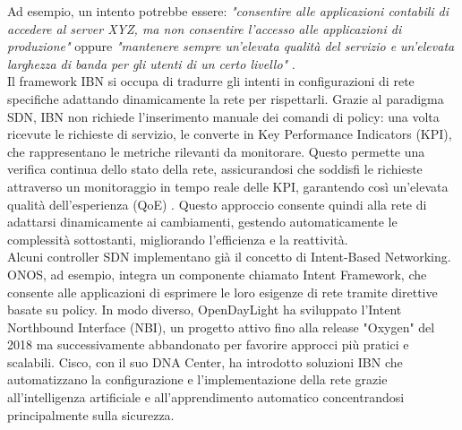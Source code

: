 Ad esempio, un intento potrebbe essere: \textit{"consentire alle applicazioni contabili di accedere al server XYZ, ma non consentire l’accesso alle applicazioni di produzione"} oppure
\textit{"mantenere sempre un'elevata qualità del servizio e un'elevata larghezza di banda per gli utenti di un certo livello"} \cite{esempint}.
\\Il framework IBN si occupa di tradurre gli intenti
in configurazioni di rete specifiche adattando dinamicamente la rete per rispettarli. %
Grazie al paradigma SDN, IBN non richiede l'inserimento manuale dei comandi di policy: una volta ricevute le richieste di servizio, le converte in Key Performance Indicators (KPI), che rappresentano le metriche rilevanti da monitorare. 
Questo permette una verifica continua dello stato della rete, assicurandosi che soddisfi le richieste attraverso un monitoraggio in tempo reale delle KPI, garantendo così un'elevata qualità dell'esperienza (QoE) \cite{qoe}.
Questo approccio consente quindi alla rete di adattarsi dinamicamente ai cambiamenti, gestendo automaticamente le complessità sottostanti, migliorando l'efficienza e la reattività.
\\Alcuni controller SDN implementano già il concetto di Intent-Based Networking. 
\\ONOS, ad esempio, integra un componente chiamato Intent Framework, che consente alle applicazioni di esprimere le loro esigenze di rete tramite direttive basate su policy. 
In modo diverso, OpenDayLight ha sviluppato l'Intent Northbound Interface (NBI), un progetto attivo fino alla release "Oxygen" del 2018 ma successivamente abbandonato per favorire approcci più pratici e scalabili. 
Cisco, con il suo DNA Center, ha introdotto soluzioni IBN che automatizzano la configurazione e l'implementazione della rete grazie all'intelligenza artificiale e all'apprendimento automatico concentrandosi principalmente sulla sicurezza. 
